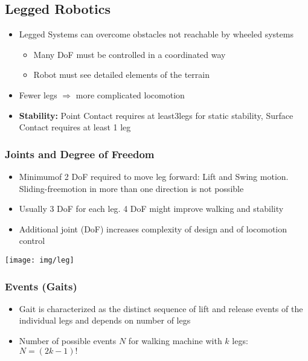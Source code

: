 \documentclass[fontsize=6pt]{scrartcl}
\begin{document}
\begin{multicols*}{4}
\subsection*{Legged Robotics}
\begin{itemize}
	\item Legged Systems can overcome obstacles not reachable by wheeled systems
	\begin{itemize}
		\item Many DoF must be controlled in a coordinated way
		\item Robot must see detailed elements of the terrain
	\end{itemize}
	\item Fewer legs $\Rightarrow$ more complicated locomotion
	\item \textbf{Stability:} Point Contact requires at least3legs for 
		  static stability, Surface Contact requires at least 1 leg
\end{itemize}

\subsubsection*{Joints and Degree of Freedom}

\begin{minipage}{0.69\linewidth}
	\begin{itemize}
		\item Minimumof 2 DoF required to move leg forward: Lift and Swing motion.
			  Sliding-freemotion in more than one direction is not possible
		\item Usually 3 DoF for each leg. 4 DoF might improve walking and stability
		\item Additional joint (DoF) increases complexity of design and of locomotion control
	\end{itemize}
\end{minipage}
\begin{minipage}{0.3\linewidth}
	\texttt{[image: img/leg]}
\end{minipage}

\subsubsection*{Events (Gaits)}
\begin{itemize}
	\item Gait is characterized as the distinct sequence of lift and release events
		  of the individual legs and depends on number of legs
	\item Number of possible events $N$ for walking machine with $k$ legs:\\ $N = (2k - 1)!$
\end{itemize}


\end{multicols*}
\end{document}
